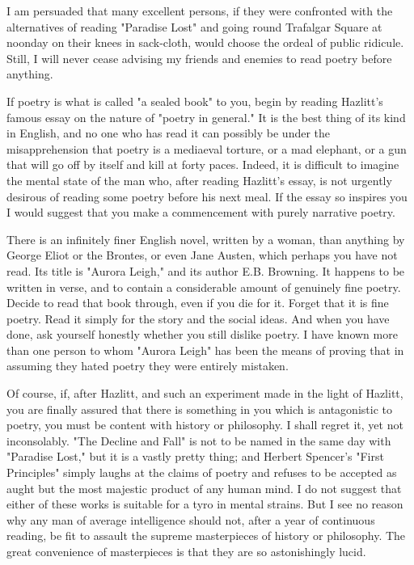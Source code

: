 I am persuaded that many excellent persons, if they were confronted
with the alternatives of reading "Paradise Lost" and going round
Trafalgar Square at noonday on their knees in sack-cloth, would choose
the ordeal of public ridicule.  Still, I will never cease advising my
friends and enemies to read poetry before anything.

If poetry is what is called "a sealed book" to you, begin by reading
Hazlitt's famous essay on the nature of "poetry in general."  It is the
best thing of its kind in English, and no one who has read it can
possibly be under the misapprehension that poetry is a mediaeval
torture, or a mad elephant, or a gun that will go off by itself and
kill at forty paces. Indeed, it is difficult to imagine the mental
state of the man who, after reading Hazlitt's essay, is not urgently
desirous of reading some poetry before his next meal.  If the essay so
inspires you I would suggest that you make a commencement with purely
narrative poetry.

There is an infinitely finer English novel, written by a woman, than
anything by George Eliot or the Brontes, or even Jane Austen, which
perhaps you have not read.  Its title is "Aurora Leigh," and its author
E.B. Browning.  It happens to be written in verse, and to contain a
considerable amount of genuinely fine poetry.  Decide to read that book
through, even if you die for it.  Forget that it is fine poetry. Read
it simply for the story and the social ideas.  And when you have done,
ask yourself honestly whether you still dislike poetry. I have known
more than one person to whom "Aurora Leigh" has been the means of
proving that in assuming they hated poetry they were entirely mistaken.

Of course, if, after Hazlitt, and such an experiment made in the light
of Hazlitt, you are finally assured that there is something in you
which is antagonistic to poetry, you must be content with history or
philosophy. I shall regret it, yet not inconsolably. "The Decline and
Fall" is not to be named in the same day with "Paradise Lost," but it
is a vastly pretty thing; and Herbert Spencer's "First Principles"
simply laughs at the claims of poetry and refuses to be accepted as
aught but the most majestic product of any human mind.  I do not
suggest that either of these works is suitable for a tyro in mental
strains.  But I see no reason why any man of average intelligence
should not, after a year of continuous reading, be fit to assault the
supreme masterpieces of history or philosophy.  The great convenience
of masterpieces is that they are so astonishingly lucid.

